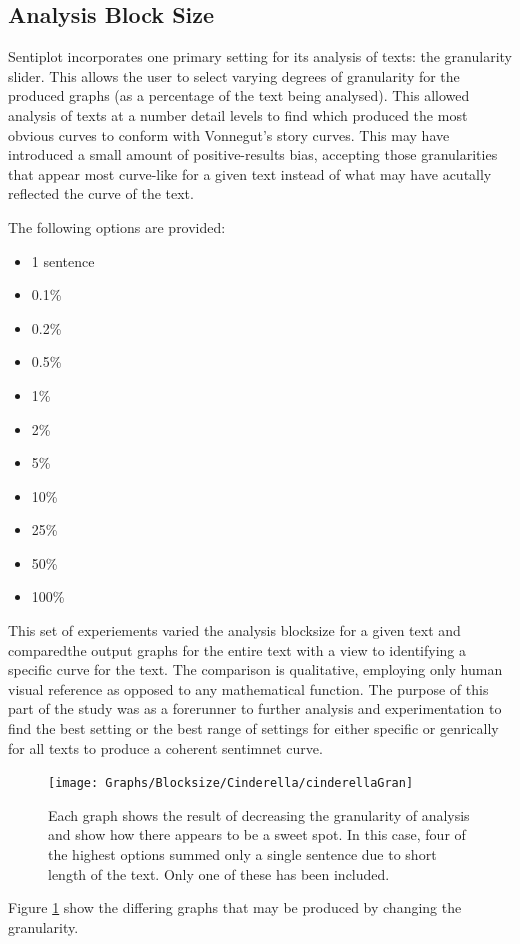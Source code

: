 \documentclass{article}
\begin{document}
    \subsection{Analysis Block Size}
        Sentiplot incorporates one primary setting for its analysis of texts: the granularity slider. This allows the user to select varying degrees of granularity for the produced graphs (as a percentage of the text being analysed). This allowed analysis of texts at a number detail levels to find which produced the most obvious curves to conform with Vonnegut's story curves. This may have introduced a small amount of positive-results bias, accepting those granularities that appear most curve-like for a given text instead of what may have acutally reflected the curve of the text.

        The following options are provided:
        \begin{itemize}
            \item 1 sentence
            \item 0.1\%
            \item 0.2\%
            \item 0.5\%
            \item 1\%
            \item 2\%
            \item 5\%
            \item 10\%
            \item 25\%
            \item 50\%
            \item 100\%
        \end{itemize}
        This set of experiements varied the analysis blocksize for a given text and comparedthe output graphs for the entire text with a view to identifying a specific curve for the text. The comparison is qualitative, employing only human visual reference as opposed to any mathematical function. The purpose of this part of the study was as a forerunner to further analysis and experimentation to find the best setting or the best range of settings for either specific or genrically for all texts to produce a coherent sentimnet curve.
        \begin{figure}
            \texttt{[image: Graphs/Blocksize/Cinderella/cinderellaGran]}
            \centering
            \caption{Each graph shows the result of decreasing the granularity of analysis and show how there appears to be a sweet spot. In this case, four of the highest options summed only a single sentence due to short length of the text. Only one of these has been included.}
            \label{fig:cinderellaGran}
        \end{figure}
        Figure \ref{fig:cinderellaGran} show the differing graphs that may be produced by changing the granularity.
\end{document}
